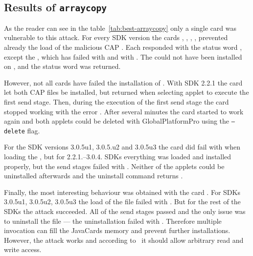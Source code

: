 \documentclass{../llncs/llncs}
\begin{document}
\subsection{Results of \texttt{arraycopy}}\label{subsec:result-arraycopy}
            As the reader can see in the table~\ref{tab:best-arraycopy} only a single card was vulnerable to this attack. For every SDK version the cards \Cnewcard, \Fcard, \Gcard, \Hcard, \Inewcard prevented already the load of the malicious CAP \vulnscap. Each responded with the status word \swwrongdata, except the \Cnewcard, which has failed with \swunknown and \Inewcard with \swwrongdata. The \vulnscap could not have been installed on \Icard, \Ccard and the status word \swconditionsnotsatisfied was returned.

            However, not all cards have failed the installation of \vulnscap. With SDK 2.2.1 the card \Dcard let both CAP files be installed, but returned \swclanotsupported when selecting applet to execute the first send stage. Then, during the execution of the first send stage the card stopped working with the error \scardenottransacted. After several minutes the card started to work again and both applets could be deleted with GlobalPlatformPro using the \texttt{--delete} flag.

            For the SDK versions 3.0.5u1, 3.0.5.u2 and 3.0.5u3 the card \Acard did fail with \swwrongdata when loading the \appletscap, but for 2.2.1.--3.0.4. SDKs everything was loaded and installed properly, but the send stages failed with \swunknown. Neither of the applets could be uninstalled afterwards and the uninstall command returns \swconditionsnotsatisfied.

            Finally, the most interesting behaviour was obtained with the card \Jcard. For SDKs 3.0.5u1, 3.0.5u2, 3.0.5u3 the load of the file \appletscap failed with \jerror. But for the rest of the SDKs the attack succeeded. All of the send stages passed and the only issue was to uninstall the \appletscap file --- the uninstallation failed with \swconditionsnotsatisfied. Therefore multiple invocation can fill the JavaCards memory and prevent further installations. However, the attack works and according to~\cite{se:oracle:part1} it should allow arbitrary read and write access.
\end{document}
